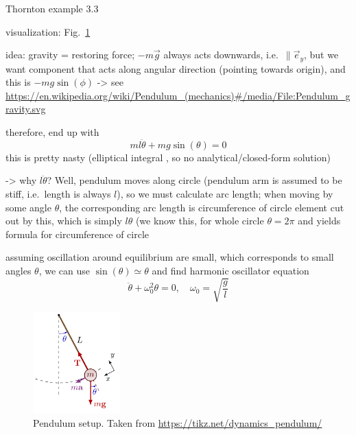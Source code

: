 \documentclass[../class_mech_main.tex]{subfiles}
\begin{document}
\begin{ex}[Pendulum]
	Thornton example 3.3

	visualization: Fig.~\ref{fig:pendulum}


	idea: gravity = restoring force; $- m \vec{g}$ always acts downwards, i.e.~$\parallel \vec{e}_y$, but we want component that acts along angular direction (pointing towards origin), and this is $- m g \sin(\phi)$ -> see \url{https://en.wikipedia.org/wiki/Pendulum_(mechanics)#/media/File:Pendulum_gravity.svg}

	therefore, end up with
	\begin{equation}
		m l \ddot{\theta} + m g \sin(\theta) = 0
	\end{equation}
	this is pretty nasty (elliptical integral , so no analytical/closed-form solution)

	-> why $l \ddot{\theta}$? Well, pendulum moves along circle (pendulum arm is assumed to be stiff, i.e.~length is always $l$), so we must calculate arc length; when moving by some angle $\theta$, the corresponding arc length is circumference of circle element cut out by this, which is simply $l \theta$ (we know this, for whole circle $\theta = 2\pi$ and yields formula for circumference of circle

	assuming oscillation around equilibrium are small, which corresponds to small angles $\theta$, we can use $\sin(\theta) \simeq \theta$ and find harmonic oscillator equation
	\begin{equation}
		\ddot{\theta} + \omega_0^2 \theta = 0, \quad \omega_0 = \sqrt{\frac{g}{l}}
	\end{equation}
\end{ex}



\begin{figure}
	\centering

	\includegraphics[width=0.3\textwidth]{pictures/pendulum.pdf}

	\caption{Pendulum setup. Taken from \url{https://tikz.net/dynamics_pendulum/}}
	\label{fig:pendulum}
\end{figure}
\end{document}
